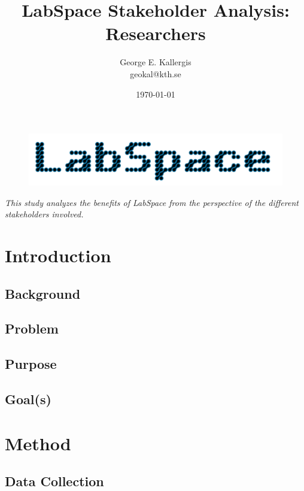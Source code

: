 \documentclass[a4paper, 11pt]{article}
\title{LabSpace Stakeholder Analysis: Researchers}
\author{George E. Kallergis\\geokal@kth.se}
\date{\today{}}
\begin{document}
\maketitle

\begin{figure}[h!]
  \begin{center}
    \includegraphics[width=\textwidth,height=\textheight,keepaspectratio]{imagery/logo.png}
    \label{fig:dneaf}
  \end{center}
\end{figure}

\textit{This study analyzes the benefits of LabSpace from the perspective of the different stakeholders involved.}

\newpage

\section{Introduction}

\subsection{Background}

\subsection{Problem}

\subsection{Purpose}

\subsection{Goal(s)}

\section{Method}

\subsection{Data Collection}
\end{document}

